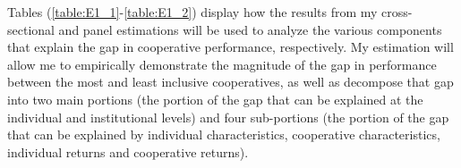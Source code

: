 \documentclass[11pt]{article}
\begin{document}
        \begin{table}[H]
        \caption{Individual vs. Institutional Decomposition (Panel)}
        \label{table:E1_2}
        \centering
        \end{table}   

Tables (\ref{table:E1_1}-\ref{table:E1_2}) display how the results from my cross-sectional and panel estimations will be used to analyze the various components that explain the gap in cooperative performance, respectively. My estimation will allow me to empirically demonstrate the magnitude of the gap in performance between the most and least inclusive cooperatives, as well as decompose that gap into two main portions (the portion of the gap that can be explained at the individual and institutional levels) and four sub-portions (the portion of the gap that can be explained by individual characteristics, cooperative characteristics, individual returns and cooperative returns). 
\end{document}

